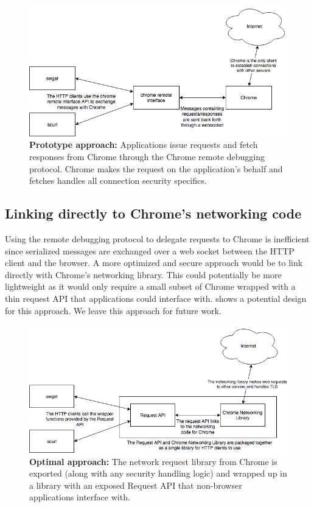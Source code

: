 \begin{figure}[h]
  \includegraphics[width=\textwidth]{figures/prototype}
  \caption[Prototype approach]{\textbf{Prototype approach:} Applications issue
  requests and fetch responses from Chrome through the Chrome remote debugging
  protocol. Chrome makes the request on the application's behalf and fetches
  handles all connection security specifics.}
  \label{fig:prototype-saber}
\end{figure}

\subsection{Linking directly to Chrome's networking code}
Using the remote debugging protocol to delegate requests to Chrome is
inefficient since serialized messages are exchanged over a web socket between
the HTTP client and the browser. A more optimized and secure approach would be
to link directly with Chrome's networking library. This could potentially be
more lightweight as it would only require a small subset of Chrome wrapped with
a thin request API that applications could interface with.
 shows a potential design for this approach. We leave
this approach for future work.

\begin{figure}[h]
  \includegraphics[width=\textwidth]{figures/long-term} \caption[Optimal
  approach]{\textbf{Optimal approach:} The network request library from Chrome
  is exported (along with any security handling logic) and wrapped up in a
  library with an exposed Request API that non-browser applications interface
  with.} \label{fig:long-term-saber}
\end{figure}

